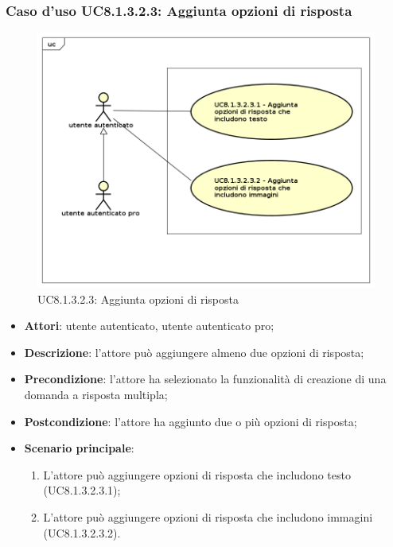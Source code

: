 \subsubsection{Caso d'uso UC8.1.3.2.3: Aggiunta opzioni di risposta}
	\label{UC8.1.3.2.3}
	\begin{figure}[h]
		\centering
			\includegraphics[scale=0.45,keepaspectratio]{UML/UC8_1_3_2_3.png}
		\caption{UC8.1.3.2.3: Aggiunta opzioni di risposta}
	\end{figure}
	\FloatBarrier
	\begin{itemize}
		\item
			\textbf{Attori}: utente autenticato, utente autenticato pro;
		\item		
			\textbf{Descrizione}: l'attore può aggiungere almeno due opzioni di risposta;
		\item
			\textbf{Precondizione}: l'attore ha selezionato la funzionalità di creazione di una domanda a risposta multipla; 
		\item
			\textbf{Postcondizione}: l'attore ha aggiunto due o più opzioni di risposta;
		\item
			\textbf{Scenario principale}:
	       		\begin{enumerate}
	       			\item
	       			L'attore può aggiungere opzioni di risposta che includono testo (UC8.1.3.2.3.1);
					\item
					L'attore può aggiungere opzioni di risposta che includono immagini (UC8.1.3.2.3.2).
	 			\end{enumerate}
	\end{itemize}	

